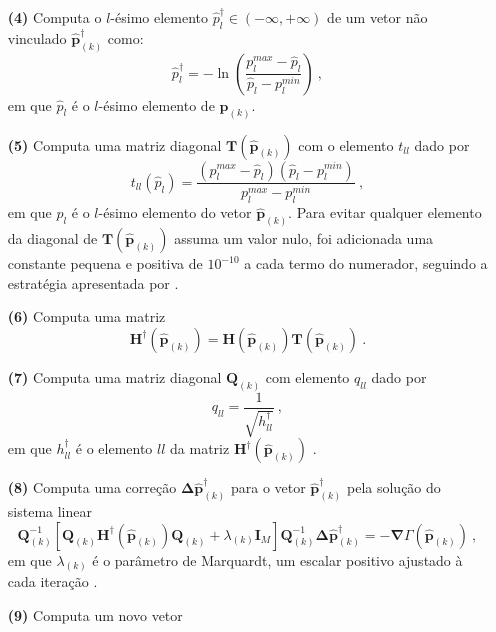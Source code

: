 \begin{itemize}
	\item[\textbf{(4)}] Computa o $l$-ésimo elemento $\hat{p}^{\dagger}_{l} \in (-\infty, +\infty)$ de um vetor não vinculado $\hat{\mathbf{p}}^{\dagger}_{(k)}$ como:
	$$
	\hat{p}^{\dagger}_{l} = -\ln\left(\frac{p_{l}^{max} - \hat{p}_{l}}{\hat{p}_{l} - p_{l}^{min}}\right) \: ,
	$$
	em que $\hat{p}_{l}$ é o $l$-ésimo elemento de $\hat{\mathbf{p}}_{(k)}$.
	\item[\textbf{(5)}] Computa uma matriz diagonal $\mathbf{T}(\hat{\mathbf{p}}_{(k)})$ 
	com o elemento $t_{ll}$ dado por
	$$
	t_{ll}(\hat{p}_{l}) = \frac{(p_{l}^{max} - \hat{p}_{l})(\hat{p}_{l} - p_{l}^{min})}{p_{l}^{max} - p_{l}^{min}} \: ,
	$$
	em que $p_{l}$ é o $l$-ésimo elemento do vetor $\hat{\mathbf{p}}_{(k)}$. Para evitar qualquer elemento da diagonal de $\mathbf{T}(\hat{\mathbf{p}}_{(k)})$ assuma um valor nulo, foi adicionada uma constante pequena e positiva de $ 10^{-10} $ a cada termo do numerador, seguindo a estratégia apresentada por \cite{barbosa_etal1999}.
	\item[\textbf{(6)}] Computa uma matriz 
	$$
	\mathbf{H}^{\dagger}(\hat{\mathbf{p}}_{(k)}) = \mathbf{H}(\hat{\mathbf{p}}_{(k)})\mathbf{T}(\hat{\mathbf{p}}_{(k)}) \: .
	$$
	\item[\textbf{(7)}] Computa uma matriz diagonal $\mathbf{Q}_{(k)}$ com elemento $q_{ll}$ dado por 
	$$
	q_{ll} = \frac{1}{\sqrt{h^{\dagger}_{ll}}} \: ,
	$$
	em que $h^{\dagger}_{ll}$ é o elemento $ll$ da matriz $\mathbf{H}^{\dagger}(\hat{\mathbf{p}}_{(k)})$ .
	\item[\textbf{(8)}] Computa uma correção 
	$\boldsymbol{\Delta}\hat{\mathbf{p}}^{\dagger}_{(k)}$ para o vetor 
	$\hat{\mathbf{p}}^{\dagger}_{(k)}$ pela solução do sistema linear
	$$
	\mathbf{Q}_{(k)}^{-1} \left[ \mathbf{Q}_{(k)} 
	\mathbf{H}^{\dagger}(\hat{\mathbf{p}}_{(k)}) \mathbf{Q}_{(k)} + 
	\lambda_{(k)} \mathbf{I}_{M} \right] \mathbf{Q}_{(k)}^{-1}
	\boldsymbol{\Delta} \hat{\mathbf{p}}^{\dagger}_{(k)} = 
	- \boldsymbol{\nabla}\Gamma(\hat{\mathbf{p}}_{(k)}) \: ,
	$$
	em que $\lambda_{(k)}$ é o parâmetro de Marquardt, um escalar positivo ajustado à cada iteração
	\citep[por exemplo,][p. 624]{seber_wild2003}.
	\item[\textbf{(9)}] Computa um novo vetor 

\end{itemize}
